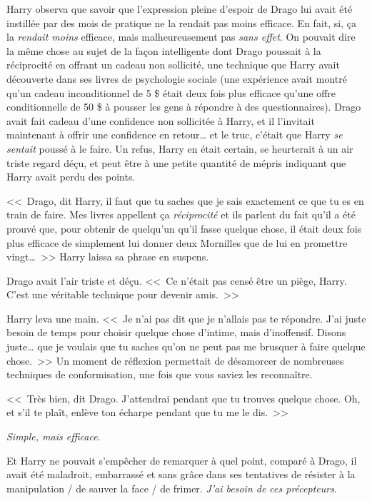 Harry observa que savoir que l'expression pleine d'espoir de Drago lui avait été instillée par des mois de pratique ne la rendait pas moins efficace. En fait, si, ça la \emph{rendait moins} efficace, mais malheureusement pas \emph{sans effet}. On pouvait dire la même chose au sujet de la façon intelligente dont Drago poussait à la réciprocité en offrant un cadeau non sollicité, une technique que Harry avait découverte dans ses livres de psychologie sociale (une expérience avait montré qu'un cadeau inconditionnel de 5 \$ était deux fois plus efficace qu'une offre conditionnelle de 50 \$ à pousser les gens à répondre à des questionnaires). Drago avait fait cadeau d'une confidence non sollicitée à Harry, et il l'invitait maintenant à offrir une confidence en retour… et le truc, c'était que Harry \emph{se sentait} poussé à le faire. Un refus, Harry en était certain, se heurterait à un air triste regard déçu, et peut être à une petite quantité de mépris indiquant que Harry avait perdu des points.

<<~Drago, dit Harry, il faut que tu saches que je sais exactement ce que tu es en train de faire. Mes livres appellent ça \emph{réciprocité} et ils parlent du fait qu'il a été prouvé que, pour obtenir de quelqu'un qu'il fasse quelque chose, il était deux fois plus efficace de simplement lui donner deux Mornilles que de lui en promettre vingt…~>> Harry laissa sa phrase en suspens.

Drago avait l'air triste et déçu. <<~Ce n'était pas censé être un piège, Harry. C'est une véritable technique pour devenir amis.~>>

Harry leva une main. <<~Je n'ai pas dit que je n'allais pas te répondre. J'ai juste besoin de temps pour choisir quelque chose d'intime, mais d'inoffensif. Disons juste… que je voulais que tu saches qu'on ne peut pas me brusquer à faire quelque chose.~>> Un moment de réflexion permettait de désamorcer de nombreuses techniques de conformisation, une fois que vous saviez les reconnaître.

<<~Très bien, dit Drago. J'attendrai pendant que tu trouves quelque chose. Oh, et s'il te plaît, enlève ton écharpe pendant que tu me le dis.~>>

\emph{Simple, mais efficace}.

Et Harry ne pouvait s'empêcher de remarquer à quel point, comparé à Drago, il avait été maladroit, embarrassé et sans grâce dans ses tentatives de résister à la manipulation / de sauver la face / de frimer. \emph{J'ai besoin de ces précepteurs}.

